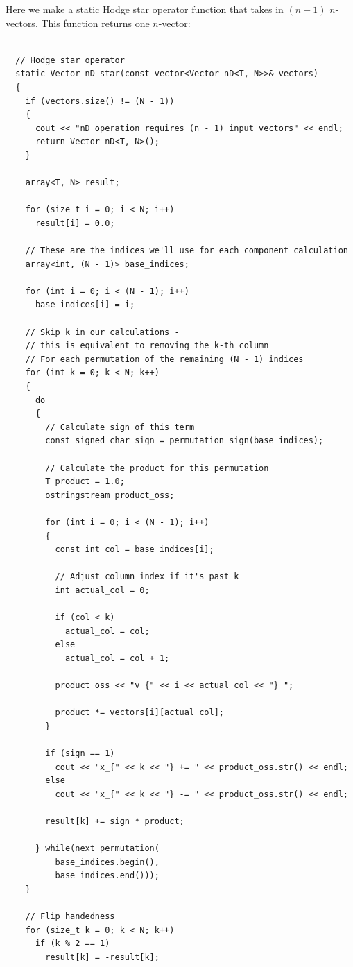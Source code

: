 \documentclass[12pt]{article}
\begin{document}
Here we make a static Hodge star operator function that takes in $(n - 1)$ $n$-vectors.
This function returns one $n$-vector:
\begin{lstlisting}

  // Hodge star operator
  static Vector_nD star(const vector<Vector_nD<T, N>>& vectors)
  {
    if (vectors.size() != (N - 1))
    {
      cout << "nD operation requires (n - 1) input vectors" << endl;
      return Vector_nD<T, N>();
    }

    array<T, N> result;

    for (size_t i = 0; i < N; i++)
      result[i] = 0.0;

    // These are the indices we'll use for each component calculation
    array<int, (N - 1)> base_indices;

    for (int i = 0; i < (N - 1); i++)
      base_indices[i] = i;

    // Skip k in our calculations - 
    // this is equivalent to removing the k-th column
    // For each permutation of the remaining (N - 1) indices
    for (int k = 0; k < N; k++)
    {
      do
      {
        // Calculate sign of this term
        const signed char sign = permutation_sign(base_indices);

        // Calculate the product for this permutation
        T product = 1.0;
        ostringstream product_oss;

        for (int i = 0; i < (N - 1); i++)
        {
          const int col = base_indices[i];

          // Adjust column index if it's past k
          int actual_col = 0;

          if (col < k)
            actual_col = col;
          else
            actual_col = col + 1;

          product_oss << "v_{" << i << actual_col << "} ";

          product *= vectors[i][actual_col];
        }

        if (sign == 1)
          cout << "x_{" << k << "} += " << product_oss.str() << endl;
        else
          cout << "x_{" << k << "} -= " << product_oss.str() << endl;

        result[k] += sign * product;

      } while(next_permutation(
          base_indices.begin(), 
          base_indices.end()));
    }

    // Flip handedness
    for (size_t k = 0; k < N; k++)
      if (k % 2 == 1)
        result[k] = -result[k];


\end{lstlisting}
\end{document}
